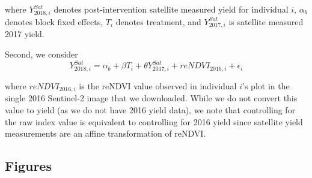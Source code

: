 \documentclass{article}
\begin{document}
where $Y_{2018,i}^{Sat}$ denotes post-intervention satellite measured yield for individual $i$, $\alpha_b$ denotes block fixed effects, $T_i$ denotes treatment, and $Y_{2017,i}^{Sat}$ is satellite measured 2017 yield. 

Second, we consider 
$$
Y_{2018,i}^{Sat} = \alpha_b + \beta T_i + \theta Y_{2017,i}^{Sat} + reNDVI_{2016,i} + \epsilon_i
$$

where $reNDVI_{2016, i}$ is the reNDVI value observed in individual $i$'s plot in the single 2016 Sentinel-2 image that we downloaded. While we do not convert this value to yield (as we do not have 2016 yield data), we note that controlling for the raw index value is equivalent to controlling for 2016 yield since satellite yield measurements are an affine transformation of reNDVI.



\clearpage
\pagebreak

\singlespace




\pagebreak
\clearpage


\begin{center}
\section{Figures}
\end{center}

\FloatBarrier
\end{document}
